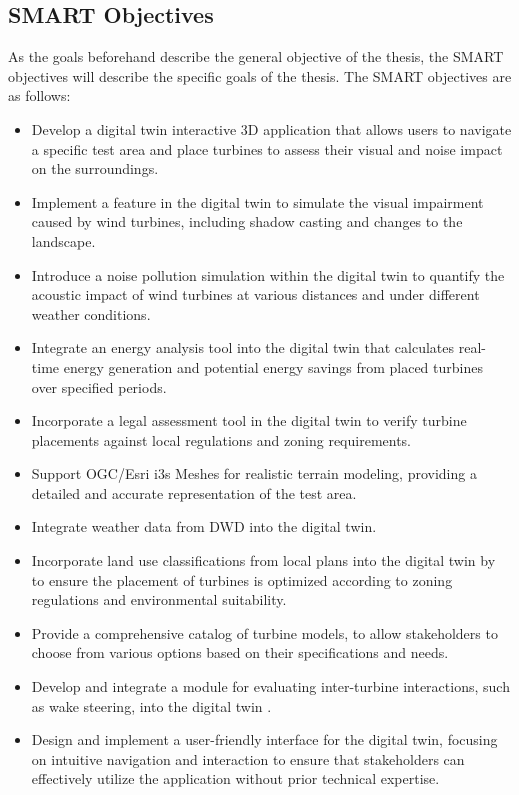 \documentclass[11pt, titlepage, a4paper]{scrartcl}
\begin{document}
\begin{linenumbers}
    \subsection{SMART Objectives}
    As the goals beforehand describe the general objective of the thesis, the SMART objectives will describe the specific goals of the thesis. The SMART objectives are as follows:
    \begin{itemize}[label={--}]
        \item Develop a digital twin interactive 3D application  that allows users to navigate a specific test area and place turbines to assess their visual and noise impact on the surroundings.
        \item Implement a feature  in the digital twin to simulate the visual impairment caused by wind turbines, including shadow casting and changes to the landscape.
        \item Introduce a noise pollution simulation within the digital twin to quantify the acoustic impact of wind turbines at various distances and under different weather conditions.
        \item Integrate an energy analysis tool into the digital twin  that calculates real-time energy generation and potential energy savings from placed turbines over specified periods.
        \item Incorporate a legal assessment tool  in the digital twin to verify turbine placements against local regulations and zoning requirements.
        \item Support OGC/Esri i3s Meshes for realistic terrain modeling, providing a detailed and accurate representation of the test area.
        \item Integrate weather data from DWD into the digital twin.
        \item Incorporate land use classifications from local plans into the digital twin by to ensure the placement of turbines is optimized according to zoning regulations and environmental suitability.
        \item Provide a comprehensive catalog of turbine models, to allow stakeholders to choose from various options based on their specifications and needs.
        \item Develop and integrate a module for evaluating inter-turbine interactions, such as wake steering, into the digital twin \cite{howlandWindFarmPower2019a}.
        \item  Design and implement a user-friendly interface for the digital twin, focusing on intuitive navigation and interaction to ensure that stakeholders can effectively utilize the application without prior technical expertise.

\end{itemize}
\end{linenumbers}
\end{document}
